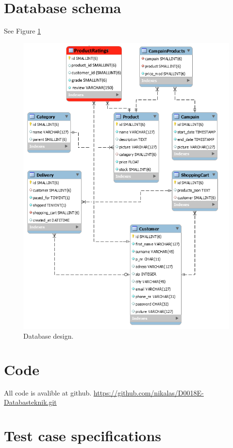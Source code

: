 \documentclass[paper=a4, fontsize=11pt]{report} %
\begin{document}
\begin{itemize}
\section*{Database schema}
See Figure \ref{fig:6}
\begin{figure}
	\includegraphics[scale=0.7]{artifacts/db_implemented_1_3.png}
	\caption{Database design.}
	\label{fig:6}
\end{figure}

\section*{Code}
All code is avalible at github.
\url{https://github.com/nikalas/D0018E-Databasteknik.git}

\section*{Test case specifications}


\end{itemize}
\end{document}
